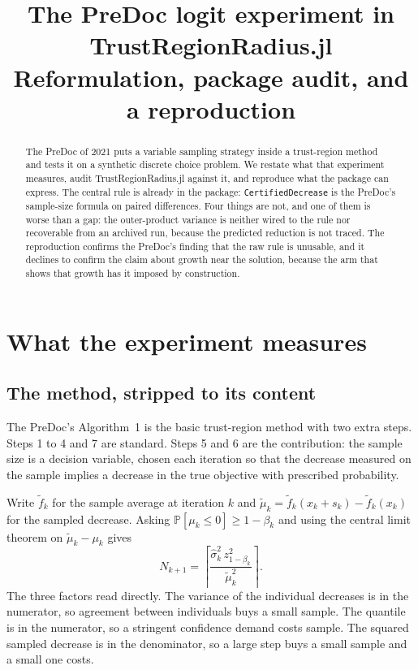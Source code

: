 \documentclass[11pt,a4paper]{article}
\title{The PreDoc logit experiment in \textsf{TrustRegionRadius.jl}\\
       \large Reformulation, package audit, and a reproduction}
\author{}
\date{}
\begin{document}
\maketitle

\begin{abstract}
The PreDoc of 2021 puts a variable sampling strategy inside a trust-region
method and tests it on a synthetic discrete choice problem. We restate what that
experiment measures, audit \textsf{TrustRegionRadius.jl} against it, and
reproduce what the package can express. The central rule is already in the
package: \texttt{CertifiedDecrease} is the PreDoc's sample-size formula on paired
differences. Four things are not, and one of them is worse than a gap: the
outer-product variance is neither wired to the rule nor recoverable from an
archived run, because the predicted reduction is not traced. The reproduction
confirms the PreDoc's finding that the raw rule is unusable, and it declines to
confirm the claim about growth near the solution, because the arm that shows that
growth has it imposed by construction.
\end{abstract}

\tableofcontents

\section{What the experiment measures}\label{sec: reformulation}

\subsection{The method, stripped to its content}

The PreDoc's Algorithm~1 is the basic trust-region method with two extra steps.
Steps 1 to 4 and 7 are standard. Steps 5 and 6 are the contribution: the sample
size is a decision variable, chosen each iteration so that the decrease measured
on the sample implies a decrease in the true objective with prescribed
probability.

Write $\tilde f_k$ for the sample average at iteration $k$ and
$\tilde\mu_k = \tilde f_k(x_k+s_k) - \tilde f_k(x_k)$ for the sampled decrease.
Asking $\mathbb{P}[\mu_k \leq 0] \geq 1-\beta_k$ and using the central limit
theorem on $\tilde\mu_k - \mu_k$ gives
\begin{equation}
  N_{k+1} = \left\lceil
    \frac{\hat\sigma_k^2\, z_{1-\beta_k}^2}{\tilde\mu_k^2}
  \right\rceil .
  \label{eqn: predoc rule}
\end{equation}
The three factors read directly. The variance of the individual decreases is in
the numerator, so agreement between individuals buys a small sample. The quantile
is in the numerator, so a stringent confidence demand costs sample. The squared
sampled decrease is in the denominator, so a large step buys a small sample and a
small one costs.
\end{document}
